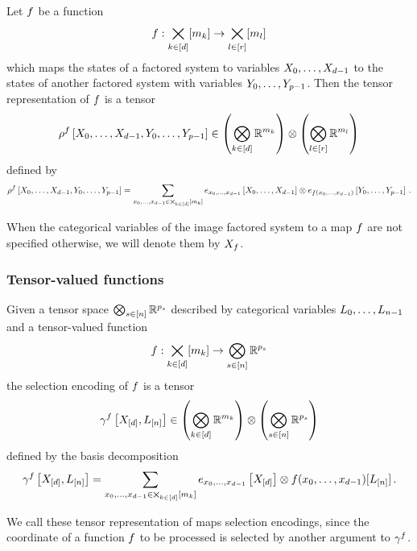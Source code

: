\begin{definition}\label{def:functionRepresentation}
	Let $f$ be a function
		\[ f : \bigtimes_{k\in[d]}[m_{k}] \rightarrow  \bigtimes_{l\in[r]}[m_{l}] \]
	which maps the states of a factored system to variables $X_{0},\ldots,X_{d-1}$ to the states of another factored system with variables $Y_{0},\ldots,Y_{p-1}$.
	Then the tensor representation of $f$ is a tensor
		\[ \rho^{f}\left[X_{0},\ldots,X_{d-1},Y_{0},\ldots,Y_{p-1}\right] \in   \left(\bigotimes_{k\in[d]} \mathbb{R}^{m_{k}}\right) \otimes \left(\bigotimes_{l\in[r]} \mathbb{R}^{m_{l}}\right)  \]
	defined by
		\[ \rho^{f}\left[X_{0},\ldots,X_{d-1},Y_{0},\ldots,Y_{p-1}\right]= \sum_{x_{0},\ldots,x_{d-1}\in\bigtimes_{k\in[d]}[m_{k}]}  
		  e_{x_{0},\ldots,x_{d-1}}\left[X_{0},\ldots,X_{d-1}\right] \otimes e_{f(x_{0},\ldots,x_{d-1})}\left[Y_{0},\ldots,Y_{p-1}\right] \, . \]
\end{definition}

When the categorical variables of the image factored system to a map $f$ are not specified otherwise, we will denote them by $X_{f}$.


\subsubsection{Tensor-valued functions}


\begin{definition}\label{def:selectionEncoding}
	Given a tensor space $\bigotimes_{s\in[n]}\mathbb{R}^{p_{s}}$ described by categorical variables $L_{0},\ldots,L_{n-1}$ and a tensor-valued function
		\[ f : \bigtimes_{k\in[d]}[m_{k}] \rightarrow \bigotimes_{s\in[n]}\mathbb{R}^{p_{s}} \]
	the selection encoding of $f$ is a tensor
		\[ \gamma^{f}\left[X_{[d]},L_{[n]}\right] \in \left(\bigotimes_{k\in[d]} \mathbb{R}^{m_{k}}\right) \otimes \left(\bigotimes_{s\in[n]}\mathbb{R}^{p_{s}}\right) \]
	defined by the basis decomposition
		\[ \gamma^{f}\left[X_{[d]},L_{[n]}\right] = \sum_{x_{0},\ldots,x_{d-1}\in\bigtimes_{k\in[d]}[m_{k}]} e_{x_{0},\ldots,x_{d-1}}\left[X_{[d]}\right] \otimes f(x_{0},\ldots,x_{d-1})[L_{[n]}] \, .  \]
\end{definition}

We call these tensor representation of maps selection encodings, since the coordinate of a function $f$ to be processed is selected by another argument to $\gamma^{f}$.

